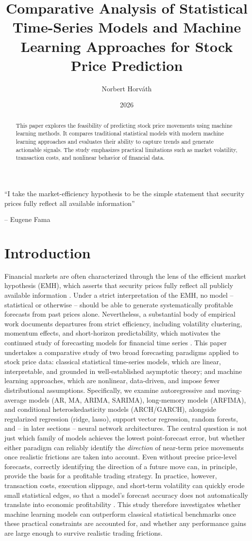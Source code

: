 \documentclass[12pt,a4paper]{article}
\title{Comparative Analysis of Statistical Time-Series Models and Machine Learning Approaches for Stock Price Prediction}
\author{Norbert Horváth}
\date{2026}
\begin{document}
\maketitle
\epigraph{
``I take the market-efficiency hypothesis to be the simple statement that security prices fully reflect all available information''
}{-- Eugene Fama}
\begin{abstract}
This paper explores the feasibility of predicting stock price movements using machine learning methods. It compares traditional statistical models with modern machine learning approaches and evaluates their ability to capture trends and generate actionable signals. The study emphasizes practical limitations such as market volatility, transaction costs, and nonlinear behavior of financial data.
\end{abstract}

\section{Introduction}
Financial markets are often characterized through the lens of the efficient market hypothesis (EMH), which asserts that security prices fully reflect all publicly available information \cite{7104d0bd-69aa-330c-badb-94aa0c8f5bac}.
Under a strict interpretation of the EMH, no model -- statistical or otherwise -- should be able to generate systematically profitable forecasts from past prices alone. Nevertheless, a substantial body of empirical work documents departures from strict efficiency, including volatility clustering, momentum effects, and short-horizon predictability, which motivates the continued study of forecasting models for financial time series \cite{Tsay_2010}.
This paper undertakes a comparative study of two broad forecasting paradigms applied to stock price data: classical statistical time-series models, which are linear, interpretable, and grounded in well-established asymptotic theory; and machine learning approaches, which are nonlinear, data-driven, and impose fewer distributional assumptions. Specifically, we examine autoregressive and moving-average models (AR, MA, ARIMA, SARIMA), long-memory models (ARFIMA), and conditional heteroskedasticity models (ARCH/GARCH), alongside regularized regression (ridge, lasso), support vector regression, random forests, and -- in later sections -- neural network architectures. The central question is not just which family of models achieves the lowest point-forecast error, but whether either paradigm can reliably identify the \emph{direction} of near-term price movements once realistic frictions are taken into account.
Even without precise price-level forecasts, correctly identifying the direction of a future move can, in principle, provide the basis for a profitable trading strategy. In practice, however, transaction costs, execution slippage, and short-term volatility can quickly erode small statistical edges, so that a model's forecast accuracy does not automatically translate into economic profitability \cite{49018680cf534023b6ae0f4e933c475d}.
This study therefore investigates whether machine learning models can outperform classical statistical benchmarks once these practical constraints are accounted for, and whether any performance gains are large enough to survive realistic trading frictions.
\end{document}
